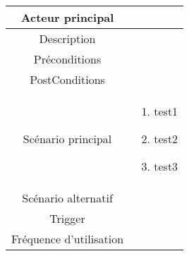 \section{}

\newpage

\subsection{}
\begin{table}[h]
    \begin{tabular}{|c|p{10cm}|}
       \hline
       Acteur principal&\\
       \hline
       Description&    \\
       \hline
       Préconditions&      \\
       \hline
       PostConditions&      \\
       \hline
       Scénario principal& 
             \begin{enumerate}
                \item test1
                \item test2
                \item test3
             \end{enumerate}     \\
       \hline
       Scénario alternatif&      \\
       \hline
       Trigger&      \\
       \hline
       Fréquence d'utilisation&      \\
       \hline
    \end{tabular}
 \end{table}
